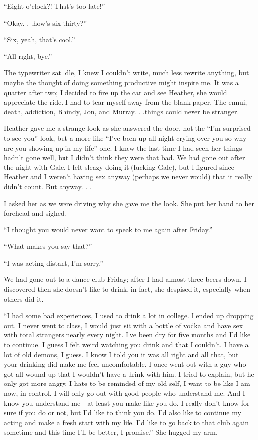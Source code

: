 ``Eight o'clock?! That's too late!''

``Okay. . .how's six-thirty?''

``Six, yeah, that's cool.''

``All right, bye.''

The typewriter sat idle, I knew I couldn't write, much less rewrite
anything, but maybe the thought of doing something productive might
inspire me. It was a quarter after two; I decided to fire up the car and
see Heather, she would appreciate the ride. I had to tear myself away
from the blank paper. The ennui, death, addiction, Rhindy, Jon, and
Murray. . .things could never be stranger.

Heather gave me a strange look as she answered the door, not the ``I'm
surprised to see you'' look, but a more like ``I've been up all night
crying over you so why are you showing up in my life'' one. I knew the
last time I had seen her things hadn't gone well, but I didn't think
they were that bad. We had gone out after the night with Gale. I felt
sleazy doing it (fucking Gale), but I figured since Heather and I
weren't having sex anyway (perhaps we never would) that it really didn't
count. But anyway. . .

I asked her as we were driving why she gave me the look. She put her
hand to her forehead and sighed.

``I thought you would never want to speak to me again after Friday.''

``What makes you say that?''

``I was acting distant, I'm sorry.''

We had gone out to a dance club Friday; after I had almost three beers
down, I discovered then she doesn't like to drink, in fact, she despised
it, especially when others did it.

``I had some bad experiences, I used to drink a lot in college. I ended
up dropping out. I never went to class, I would just sit with a bottle
of vodka and have sex with total strangers nearly every night. I've been
dry for five months and I'd like to continue. I guess I felt weird
watching you drink and that I couldn't. I have a lot of old demons, I
guess. I know I told you it was all right and all that, but your
drinking did make me feel uncomfortable. I once went out with a guy who
got all wound up that I wouldn't have a drink with him. I tried to
explain, but he only got more angry. I hate to be reminded of my old
self, I want to be like I am now, in control. I will only go out with
good people who understand me. And I know you understand me---at least
you make like you do. I really don't know for sure if you do or not, but
I'd like to think you do. I'd also like to continue my acting and make a
fresh start with my life. I'd like to go back to that club again
sometime and this time I'll be better, I promise.'' She hugged my arm.


